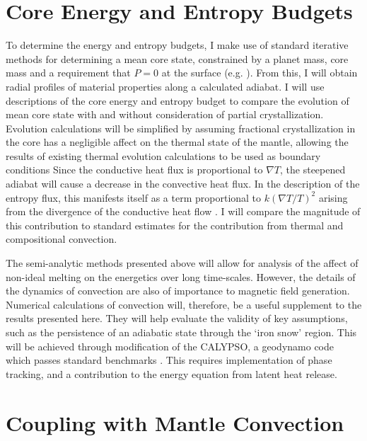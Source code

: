 \section{Core Energy and Entropy Budgets}

To determine the energy and entropy budgets, I make use of standard iterative
methods for determining a mean core state, constrained by a planet mass, core
mass and a requirement that $P=0$ at the surface (e.g. \citet{Lister1995}). From
this, I will obtain radial profiles of material properties along a calculated
adiabat.  I will use descriptions of the core energy and entropy budget
\cite{Gubbins1979,Lister1995,Lister2003} to compare the evolution of mean core state
with and without consideration of partial crystallization. Evolution
calculations will be simplified by assuming fractional crystallization in the
core has a negligible affect on the thermal state of the mantle, allowing the
results of existing thermal evolution calculations \citep{Hauck2004,Breuer2007} to
be used as boundary conditions Since the conductive heat flux is proportional
to $\nabla T$, the steepened adiabat will cause a decrease in the convective
heat flux. In the description of the entropy flux, this manifests itself as a
term proportional to $k\left(\nabla T / T \right)^2$ arising from the
divergence of the conductive heat flow \cite{Lister2003}. I will compare the
magnitude of this contribution to standard estimates for the contribution from
thermal and compositional convection.

The semi-analytic methods presented above will allow for analysis of the
affect of non-ideal melting on the energetics over long time-scales. However,
the details of the dynamics of convection are also of importance to magnetic field
generation. Numerical calculations of convection will, therefore, be a useful
supplement to the results presented here. They will help evaluate the validity of
key assumptions, such as the persistence of an adiabatic state through the
`iron snow' region. This will be achieved through modification of the CALYPSO,
a geodynamo code which passes standard benchmarks \cite{Christensen2001}. This
requires implementation of phase tracking, and a contribution to the energy
equation from latent heat release. 



\section{Coupling with Mantle Convection}

